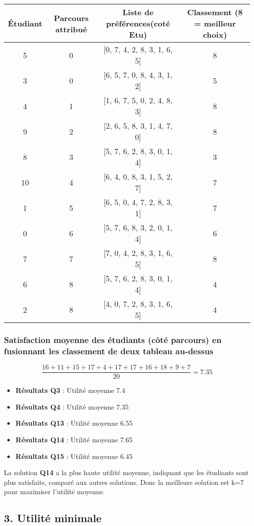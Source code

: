 \documentclass[a4paper,11pt]{article}
\begin{document}
\begin{tabular}{|c|c|c|c|}
\hline
Étudiant & Parcours attribué & Liste de préférences(coté Etu) & Classement (8 = meilleur choix) \\
\hline
5 & 0 & [0, 7, 4, 2, 8, 3, 1, 6, 5] & 8 \\
3 & 0 & [6, 5, 7, 0, 8, 4, 3, 1, 2] & 5 \\
4 & 1 & [1, 6, 7, 5, 0, 2, 4, 8, 3] & 8 \\
9 & 2 & [2, 6, 5, 8, 3, 1, 4, 7, 0] & 8 \\
8 & 3 & [5, 7, 6, 2, 8, 3, 0, 1, 4] & 3 \\
10 & 4 & [6, 4, 0, 8, 3, 1, 5, 2, 7] & 7 \\
1 & 5 & [6, 5, 0, 4, 7, 2, 8, 3, 1] & 7 \\
0 & 6 & [5, 7, 6, 8, 3, 2, 0, 1, 4] & 6 \\
7 & 7 & [7, 0, 4, 2, 8, 3, 1, 6, 5] & 8 \\
6 & 8 & [5, 7, 6, 2, 8, 3, 0, 1, 4] & 4 \\
2 & 8 & [4, 0, 7, 2, 8, 3, 1, 6, 5] & 4 \\
\hline
\end{tabular}

\subsubsection*{Satisfaction moyenne des étudiants (côté parcours) en fusionnant les classement de deux tableau au-dessus}
\[
\frac{16 + 11 + 15 + 17 + 4 + 17 + 17 + 16 + 18 + 9 + 7}{20} = 7.35
\]

\begin{itemize}
    \item \textbf{Résultats Q3} : Utilité moyenne 7.4
    \item \textbf{Résultats Q4} : Utilité moyenne 7.35
    \item \textbf{Résultats Q13} : Utilité moyenne 6.55
    \item \textbf{Résultats Q14} : Utilité moyenne 7.65
    \item \textbf{Résultats Q15} : Utilité moyenne 6.45
\end{itemize}

La solution \textbf{Q14} a la plus haute utilité moyenne, indiquant que les étudiants sont plus satisfaits, comparé aux autres solutions. Donc la meilleure solution est k=7 pour maximiser l'utilité moyenne.

\subsection*{3. Utilité minimale}
\end{document}
